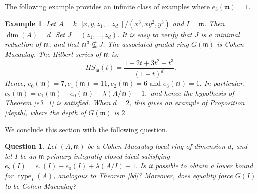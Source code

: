\documentclass[11pt]{amsart}
\theoremstyle{plain}
\newtheorem{question}[theorem]{Question}
\newtheorem{example}[theorem]{Example}
\newcommand{\m}{\mathfrak{m}}
\newcommand{\type}{\operatorname{type}}
\theoremstyle{plain}
\begin{document}
The following example provides an infinite class of examples where $e_{3}(\m)=1$.

\begin{example} \normalfont
   Let $A=k[|x,y,z_1,\ldots z_d|]/(x^3,xy^2,y^3)$ and $I=\m$. Then $\dim(A)=d$. Set $J=(z_1,\ldots,z_d)$. It is easy to verify that $J$ is a minimal reduction of $\mathfrak{m}$, and that $\mathfrak{m}^3 \nsubseteq J$.
The associated graded ring $G(\mathfrak{m})$ is Cohen-Macaulay. The Hilbert series of $\m$ is:  $$HS_{\m}(t)=\frac{1+2t+3t^2+t^3}{(1-t)^{d}}.$$ Hence, $e_0(\m)=7, e_1(\m)=11, e_2(\m)=6 \text{ and } e_3(\m)=1.$  In particular, $e_2(\m)=e_1(\m)-e_0(\m)+\lambda(A/\m)+1,$ and hence the hypothesis of Theorem \ref{e3=1} is satisfied. When $d=2$, this gives  an example of Proposition \ref{depth}, where the depth of $G(\m)$ is $2.$ 
\end{example}

We conclude this section with the following question.
\begin{question} \normalfont
Let $(A, \mathfrak m)$ be a Cohen-Macaulay local ring of dimension $d$, and let $I$ be an $\mathfrak m$-primary integrally closed ideal satisfying $e_2(I)=e_1(I)-e_0(I)+\lambda(A/I)+1.$ Is it possible to obtain a lower bound for $\type_I(A)$, analogous to Theorem \ref{bd}? Moreover, does equality  force   $G(I)$ to be Cohen-Macaulay?

\end{question}
\end{document}
